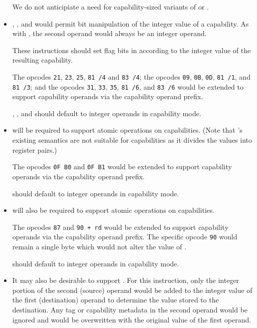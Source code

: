 \begin{itemize}
    We do not anticipiate a need for capability-sized variants of
     or .

  \item {}, , and  would
    permit bit manipulation of the integer value of a capability.  As
    with , the second operand would always be an
    integer operand.

    These instructions should set flag bits in \RFLAGS{} according to
    the integer value of the resulting capability.

    The  opcodes \texttt{21}, \texttt{23}, \texttt{25},
    \texttt{81 /4} and \texttt{83 /4}; the  opcodes
    \texttt{09}, \texttt{0B}, \texttt{0D}, \texttt{81 /1}, and
    \texttt{81 /3}; and the  opcodes \texttt{31},
    \texttt{33}, \texttt{35}, \texttt{81 /6}, and \texttt{83 /6} would
    be extended to support capability operands via the capability
    operand prefix.

    , , and  should
    default to integer operands in capability mode.

  \item {} will be required to support atomic
    operations on capabilities.  (Note that 's
    existing semantics are not suitable for capabilities as it divides
    the values into register pairs.)

    The opcodes \texttt{0F B0} and \texttt{0F B1} would be extended to
    support capability operands via the capability operand prefix.

     should default to integer operands in
    capability mode.

  \item {} will also be required to support atomic
    operations on capabilities.

    The opcodes \texttt{87} and \texttt{90 + rd} would be extended to
    support capability operands via the capability operand prefix.
    The specific opcode \texttt{90} would remain a single byte
     which would not alter the value of \CAX{}.

     should default to integer operands in capability
    mode.

  \item It may also be desirable to support .  For
    this instruction, only the integer portion of the second (source)
    operand would be added to the integer value of the first
    (destination) operand to determine the value stored to the
    destination.  Any tag or capability metadata in the second operand
    would be ignored and would be overwritten with the original value
    of the first operand.


\end{itemize}
